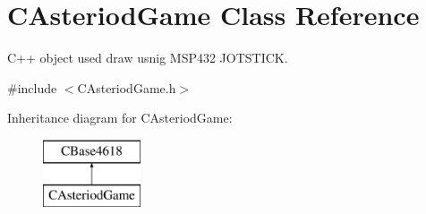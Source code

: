 \hypertarget{class_c_asteriod_game}{}\section{C\+Asteriod\+Game Class Reference}
\label{class_c_asteriod_game}


C++ object used draw usnig M\+S\+P432 J\+O\+T\+S\+T\+I\+CK.  




{\ttfamily \#include $<$C\+Asteriod\+Game.\+h$>$}

Inheritance diagram for C\+Asteriod\+Game\+:\begin{figure}[H]
\begin{center}
\leavevmode
\includegraphics[height=2.000000cm]{class_c_asteriod_game}
\end{center}
\end{figure}
